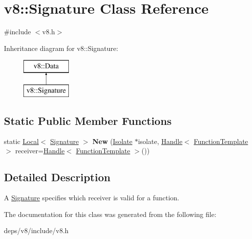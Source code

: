 \hypertarget{classv8_1_1_signature}{}\section{v8\+:\+:Signature Class Reference}
\label{classv8_1_1_signature}


{\ttfamily \#include $<$v8.\+h$>$}

Inheritance diagram for v8\+:\+:Signature\+:\begin{figure}[H]
\begin{center}
\leavevmode
\includegraphics[height=2.000000cm]{classv8_1_1_signature}
\end{center}
\end{figure}
\subsection*{Static Public Member Functions}
\begin{DoxyCompactItemize}
\item 
\hypertarget{classv8_1_1_signature_a1c3df0fef59e22a74f0828a0deae1760}{}static \hyperlink{classv8_1_1_local}{Local}$<$ \hyperlink{classv8_1_1_signature}{Signature} $>$ {\bfseries New} (\hyperlink{classv8_1_1_isolate}{Isolate} $\ast$isolate, \hyperlink{classv8_1_1_handle}{Handle}$<$ \hyperlink{classv8_1_1_function_template}{Function\+Template} $>$ receiver=\hyperlink{classv8_1_1_handle}{Handle}$<$ \hyperlink{classv8_1_1_function_template}{Function\+Template} $>$())\label{classv8_1_1_signature_a1c3df0fef59e22a74f0828a0deae1760}

\end{DoxyCompactItemize}


\subsection{Detailed Description}
A \hyperlink{classv8_1_1_signature}{Signature} specifies which receiver is valid for a function. 

The documentation for this class was generated from the following file\+:\begin{DoxyCompactItemize}
\item 
deps/v8/include/v8.\+h\end{DoxyCompactItemize}
